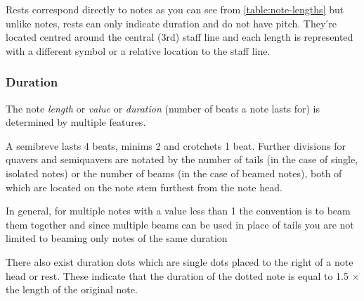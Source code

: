 Rests correspond directly to notes as you can see from \cref{table:note-lengths} but unlike notes, rests can only indicate duration and do not have pitch. They're located centred around the central (3rd) staff line and each length is represented with a different symbol or a relative location to the staff line.

\subsubsection{Duration}
\label{sec:music-theory-duration}

The note \emph{length} or \emph{value} or \emph{duration} (number of beats a note lasts for) is determined by multiple features.

A semibreve lasts 4 beats, minims 2 and crotchets 1 beat. Further divisions for quavers and semiquavers are notated by the number of tails (in the case of single, isolated notes) or the number of beams (in the case of beamed notes), both of which are located on the note stem furthest from the note head.

In general, for multiple notes with a value less than 1 the convention is to beam them together and since multiple beams can be used in place of tails you are not limited to beaming only notes of the same duration

There also exist duration dots which are single dots placed to the right of a note head or rest. These indicate that the duration of the dotted note is equal to 1.5 $\times$ the length of the original note.

